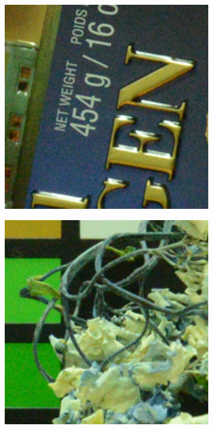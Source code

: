 \begin{figure}
\begin{subfigure}[t]{0.19\textwidth}
    \end{subfigure}
    \hfill
    \begin{subfigure}[t]{0.19\textwidth}
        \centering
        \includegraphics[width=1\textwidth]{images/mcwnnm/resize_d800_iso6400_1_real.png}
    \end{subfigure}
    \hfill
    \begin{subfigure}[t]{0.19\textwidth}
        \centering
        \includegraphics[width=1\textwidth]{images/mcwnnm/resize_d800_iso6400_2_real.png}

\end{subfigure}
\end{figure}
